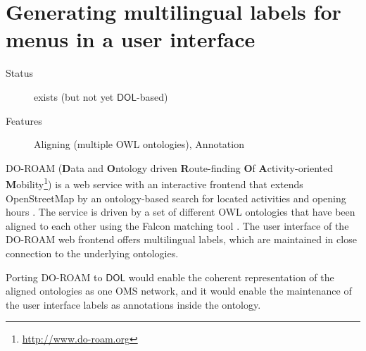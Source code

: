 \documentclass[10pt,fleqn,final]{scrreprt}
\newcommand*{\DOL}{\ensuremath{\mathsf{DOL}}\xspace}
\newcommand{\sclause}[1]{\section{#1}}
\begin{document}
\newenvironment{usecase}[3]{\sclause{#1}%
\begin{description}
\item[Status] #2
\item[Features] #3
\end{description}
}{}
\begin{usecase}{Generating multilingual labels for menus in a user interface}{exists (but not yet \DOL-based)}{Aligning (multiple OWL ontologies), Annotation}
  DO-ROAM (\textbf{D}ata and \textbf{O}ntology driven \textbf{R}oute-finding \textbf{O}f \textbf{A}ctivity-oriented \textbf{M}obility\footnote{\url{http://www.do-roam.org}}) is a web service with an interactive frontend that extends OpenStreetMap by an ontology-based search for located activities and opening hours \cite{do-roam}.  The service is driven by a set of different OWL ontologies that have been aligned to each other using the Falcon matching tool \cite{HuQu-08}.  The user interface of the DO-ROAM web frontend offers multilingual labels, which are maintained in close connection to the underlying ontologies.

  Porting DO-ROAM to \DOL would enable the coherent representation of the aligned ontologies as one OMS network, and it would enable  the maintenance of the user interface labels as annotations inside the ontology.
\end{usecase}
\end{document}
